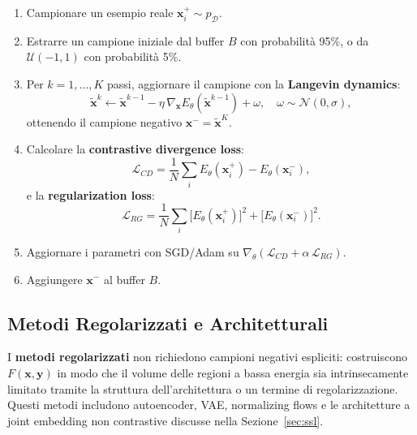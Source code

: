 \begin{enumerate}
  \item Campionare un esempio reale $\mathbf{x}^+_i \sim p_\mathcal{D}$.
  \item Estrarre un campione iniziale dal buffer $B$ con probabilità 95\%,
        o da $\mathcal{U}(-1,1)$ con probabilità 5\%.
  \item Per $k = 1,\ldots,K$ passi, aggiornare il campione con la
        \textbf{Langevin dynamics}:
        \begin{equation}
          \tilde{\mathbf{x}}^k \leftarrow \tilde{\mathbf{x}}^{k-1}
          - \eta\, \nabla_{\mathbf{x}} E_\theta(\tilde{\mathbf{x}}^{k-1})
          + \omega,
          \quad \omega \sim \mathcal{N}(0,\sigma),
        \end{equation}
        ottenendo il campione negativo $\mathbf{x}^- = \tilde{\mathbf{x}}^K$.
  \item Calcolare la \textbf{contrastive divergence loss}:
        \begin{equation}
          \mathcal{L}_{CD} = \frac{1}{N}\sum_i
          E_\theta(\mathbf{x}^+_i) - E_\theta(\mathbf{x}^-_i),
        \end{equation}
        e la \textbf{regularization loss}:
        \begin{equation}
          \mathcal{L}_{RG} = \frac{1}{N}\sum_i
          \bigl[E_\theta(\mathbf{x}^+_i)\bigr]^2
          + \bigl[E_\theta(\mathbf{x}^-_i)\bigr]^2.
        \end{equation}
  \item Aggiornare i parametri con SGD/Adam su
        $\nabla_\theta(\mathcal{L}_{CD} + \alpha\,\mathcal{L}_{RG})$.
  \item Aggiungere $\mathbf{x}^-$ al buffer $B$.
\end{enumerate}

\subsection{Metodi Regolarizzati e Architetturali}
\label{subsec:regularized-methods}

I \textbf{metodi regolarizzati} non richiedono campioni negativi espliciti:
costruiscono $F(\mathbf{x},\mathbf{y})$ in modo che il volume delle regioni
a bassa energia sia intrinsecamente limitato tramite la struttura
dell'architettura o un termine di regolarizzazione.
Questi metodi includono autoencoder, VAE, normalizing flows e le architetture
a joint embedding non contrastive discusse nella Sezione~\ref{sec:ssl}.

